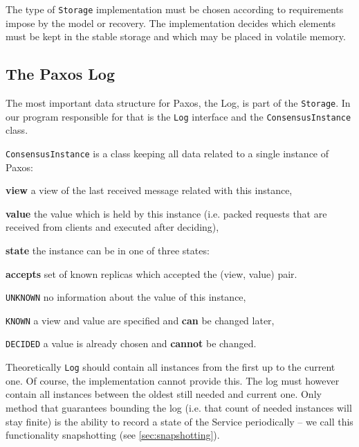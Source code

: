 \strut

The type of \texttt{Storage} implementation must be chosen according to requirements impose by the model or recovery.
The implementation decides which elements must be kept in the stable storage and which may be placed in volatile memory.

\subsection{The Paxos Log}
\label{subsec:the_paxos_log}
The most important data structure for Paxos, the Log, is part of the \texttt{Storage}.
In our program responsible for that is the \texttt{Log} interface and the \texttt{Con\-sen\-susInstance} class.

\texttt{ConsensusInstance} is a class keeping all data related to a single instance of Paxos: %
\begin{tightList}[\setlength{\itemindent}{0pt}\setlength{\leftmargin}{2\leftmargin}]
  \item[\textbf{view}] a view of the last received message related with this instance,
  \item[\textbf{value}] the value which is held by this instance (i.e. packed requests that are received from clients and executed after deciding), %
  \item[\textbf{state}] the instance can be in one of three states:
  \item[\textbf{accepts}] set of known replicas which accepted the (view, value) pair.
  \begin{tightList}[\setlength{\itemindent}{0pt} \setlength{\labelwidth}{7em}]
    \item[\texttt{\tiny UNKNOWN}] no information about the value of this instance,
    \item[\texttt{\tiny KNOWN}] a view and value are specified and \textbf{can} be changed later,
    \item[\texttt{\tiny DECIDED}] a value is already chosen and \textbf{cannot} be changed.
  \end{tightList}
\end{tightList}

Theoretically \texttt{Log} should contain all instances from the first up to the current one. Of course, the implementation cannot provide this. The log must however contain all instances between the oldest still needed and current one. Only method that guarantees bounding the log (i.e. that count of needed instances will stay finite) is the ability to record a state of the Service periodically -- we call this functionality snapshotting (see \ref{sec:snapshotting}). %

